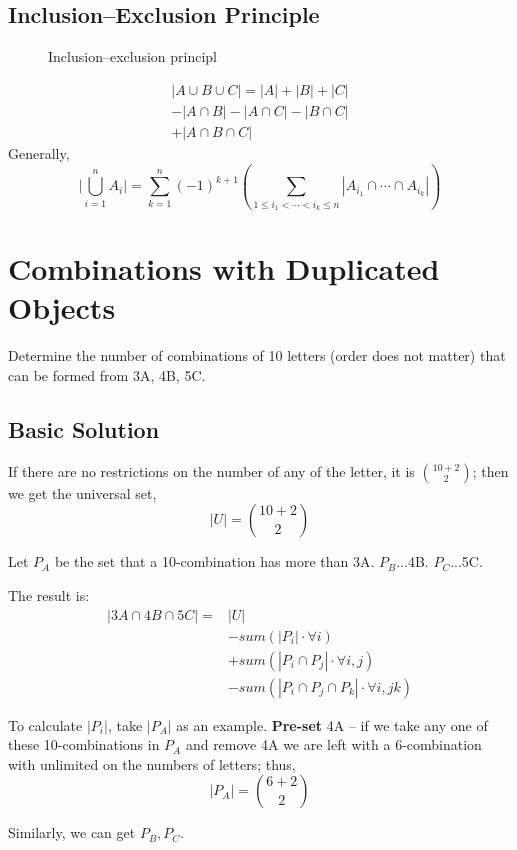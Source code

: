 \subsection{Inclusion–Exclusion Principle}
\begin{figure}[hbtp]
\centering
{}
\caption{Inclusion–exclusion principl}
\label{fig:500px-Inclusion-exclusion}
\end{figure}
\begin{eqnarray*}
|A \cup B \cup C| = |A| + |B| + |C| \\ - |A \cap B| - |A \cap C| - |B \cap C| \\ + |A \cap B \cap C|
\end{eqnarray*}
Generally,
$$
\Biggl|\bigcup_{i=1}^n A_i\Biggr| = \sum_{k = 1}^{n} (-1)^{k+1} \left( \sum_{1 \leq i_{1} < \cdots < i_{k} \leq n} \left| A_{i_{1}} \cap \cdots \cap A_{i_{k}} \right| \right)
$$
\section{Combinations with Duplicated Objects}
Determine the number of combinations of 10 letters (order does not matter) that can be formed from 3A, 4B, 5C. 

\subsection{Basic Solution}
If there are no restrictions on the number of any of the letter, it is ${10+2 \choose 2}$; then we get the universal set, 
$$
|U|={10+2 \choose 2}
$$

Let $P_A$ be the set that a 10-combination has more than 3A. $P_B$...4B. $P_C$...5C. 

The result is:
\begin{align*}
|3A \cap 4B \cap 5C| = & |U|\\
& - sum(|P_i|\cdot \forall i) \\
& + sum(|P_i \cap P_j|\cdot \forall i,j)\\
& - sum(|P_i \cap P_j \cap P_k|\cdot \forall i,jk)
\end{align*}

To calculate $|P_i|$, take $|P_A|$ as an example. \textbf{Pre-set} 4A -- if we take any one of these 10-combinations in $P_A$ and remove 4A we are left with a 6-combination with unlimited on the numbers of letters; thus,
$$
|P_A|={6+2 \choose 2}
$$

Similarly, we can get $P_B, P_C$.

